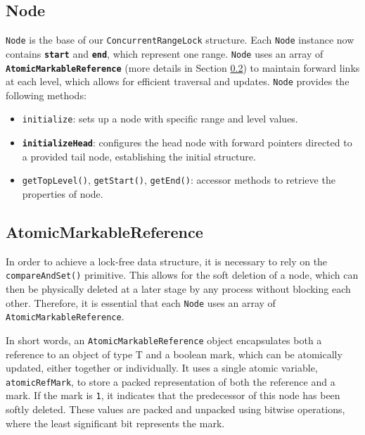 \subsection{Node}\label{subsec:node}

\texttt{Node} is the base of our \texttt{ConcurrentRangeLock} structure.
Each \texttt{Node} instance now contains \textbf{\texttt{start}} and \textbf{\texttt{end}}, which represent one range.
\texttt{Node} uses an array of \textbf{\texttt{AtomicMarkableReference}} (more details in Section \ref{subsec:atomicmarkablereference}) to maintain forward links at each level, which allows for efficient traversal and updates. 
\texttt{Node} provides the following methods:

\begin{itemize}
    \item \texttt{initialize}: sets up a node with specific range and level values.
    \item \textbf{\texttt{initializeHead}}: configures the head node with forward pointers directed to a provided tail node, establishing the initial structure.
    \item \texttt{getTopLevel()}, \texttt{getStart()}, \texttt{getEnd()}: accessor methods to retrieve the properties of node.
\end{itemize}

\begin{figure}[h]
    \centering
    
\end{figure}

\clearpage

\subsection{AtomicMarkableReference} \label{subsec:atomicmarkablereference}

In order to achieve a lock-free data structure, it is necessary to rely on the \texttt{compareAndSet()} primitive. 
This allows for the soft deletion of a node, which can then be physically deleted at a later stage by any process without blocking each other. 
Therefore, it is essential that each \texttt{Node} uses an array of \texttt{AtomicMarkableReference}.

In short words, an \texttt{AtomicMarkableReference} object encapsulates both a reference to an object of type T and a boolean mark, which can be atomically updated, either together or individually. 
It uses a single atomic variable, \texttt{atomicRefMark}, to store a packed representation of both the reference and a mark. 
If the mark is \texttt{1}, it indicates that the predecessor of this node has been softly deleted. 
These values are packed and unpacked using bitwise operations, where the least significant bit represents the mark.

